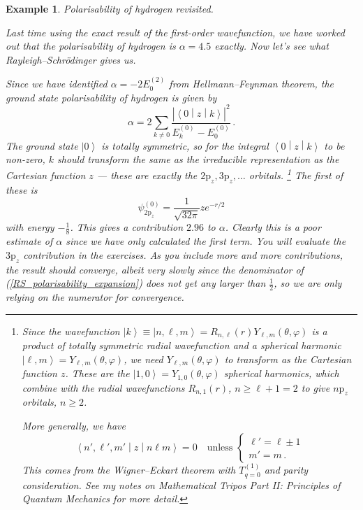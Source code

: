 \documentclass{article}
\theoremstyle{plain}\theoremheaderfont{\normalfont\itshape}\theorembodyfont{\rmfamily}\theoremseparator{.}\newtheorem*{rem}{Remark}\newtheorem*{ex}{Example}\newtheorem*{proof}{Proof}\newtheorem*{altp}{Alternative proof}
\theoremstyle{plain}\theoremheaderfont{\normalfont\bfseries}\theorembodyfont{\rmfamily}\theoremseparator{.}\newtheorem{thm}{Theorem}[section]\newtheorem{lem}[thm]{Lemma}\newtheorem{prop}[thm]{Proposition}\newtheorem*{cor}{Corollary}\newtheorem{defn}[thm]{Definition}\newtheorem{clm}[thm]{Claim}\newtheorem{clminproof}{Claim}
\theoremstyle{break}\theoremheaderfont{\normalfont\itshape}\theorembodyfont{\rmfamily}\theoremseparator{.\medskip}\newtheorem*{proofskip}{Proof}\newtheorem*{exs}{Examples}\newtheorem*{rems}{Remarks}
\theoremstyle{break}\theoremheaderfont{\normalfont\bfseries}\theorembodyfont{\rmfamily}\theoremseparator{.\medskip}\newtheorem{lemskip}[thm]{Lemma}\newtheorem{defnskip}[thm]{Definition}\newtheorem{propskip}[thm]{Proposition}\newtheorem{thmskip}[thm]{Theorem}
\numberwithin{equation}{section}
\newcommand{\ket}[1]{\left| #1 \right\rangle}
\newcommand{\mel}[3]{\left\langle #1 \middle| #2 \middle| #3 \right\rangle}
\newcommand{\abs}[1]{\left| #1 \right|}
\begin{document}
    \begin{ex}
        \textit{Polarisability of hydrogen revisited.}

        Last time using the exact result of the first-order wavefunction, we have worked out that the polarisability of hydrogen is \(\alpha=4.5\) exactly. Now let's see what Rayleigh--Schr\"{o}dinger gives us.

        Since we have identified \(\alpha=-2E_0^{(2)}\) from Hellmann--Feynman theorem, the ground state polarisability of hydrogen is given by
        \begin{equation}\label{RS_polarisability_expansion}
            \alpha=2\sum_{k\ne 0}\frac{\abs{\mel{0}{z}{k}}^2}{E_k^{(0)}-E_0^{(0)}}\,.
        \end{equation}
        The ground state \(\ket{0}\) is totally symmetric, so for the integral \(\mel{0}{z}{k}\) to be non-zero, \(k\) should transform the same as the irreducible representation as the Cartesian function \(z\) --- these are exactly the \(2\mathrm{p}_z,3\mathrm{p}_z,\dots\) orbitals. \footnote{Since the wavefunction \(\ket{k}\equiv\ket{n,\ell,m}=R_{n,\ell}(r)Y_{\ell,m}(\theta,\varphi)\) is a product of totally symmetric radial wavefunction and a spherical harmonic \(\ket{\ell,m}=Y_{\ell,m}(\theta,\varphi)\), we need \(Y_{\ell,m}(\theta,\varphi)\) to transform as the Cartesian function \(z\). These are the \(\ket{1,0}=Y_{1,0}(\theta,\varphi)\) spherical harmonics, which combine with the radial wavefunctions \(R_{n,1}(r)\), \(n\ge \ell+1=2\) to give \(n\mathrm{p}_z\) orbitals, \(n\ge 2\).
        
        More generally, we have
        \begin{equation}
            \mel{n',\ell',m'}{z}{n\ell m}=0\quad\text{unless }\begin{cases}
                \ell'=\ell\pm 1\\
                m'= m\,.
            \end{cases}
        \end{equation}
        This comes from the Wigner--Eckart theorem with \(T_{q=0}^{(1)}\) and parity consideration. See my notes on Mathematical Tripos Part II: \textit{Principles of Quantum Mechanics} for more detail.} The first of these is
        \begin{equation}
            \psi_{2\mathrm{p}_z}^{(0)}=\frac{1}{\sqrt{32\pi}}ze^{-r/2}
        \end{equation}
        with energy \(-\frac{1}{8}\). This gives a contribution \(2.96\) to \(\alpha\). Clearly this is a poor estimate of \(\alpha\) since we have only calculated the first term. You will evaluate the \(3\mathrm{p}_z\) contribution in the exercises. As you include more and more contributions, the result should converge, albeit very slowly since the denominator of (\ref{RS_polarisability_expansion}) does not get any larger than \(\frac{1}{2}\), so we are only relying on the numerator for convergence.


\end{ex}
\end{document}
